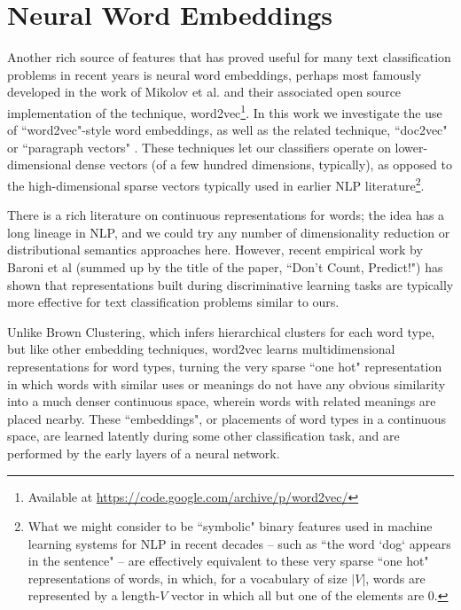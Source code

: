 \section{Neural Word Embeddings}
Another rich source of features that has proved useful for many text
classification problems in recent years is neural word embeddings, perhaps most
famously developed in the work of Mikolov et al. \cite{mikolovword2vec} and
their associated open source implementation of the technique,
word2vec\footnote{Available at
\url{https://code.google.com/archive/p/word2vec/}}. In this work we investigate
the use of ``word2vec"-style word embeddings, as well as the related technique,
``doc2vec" or ``paragraph vectors"
\cite{dai-document-embedding-2015,quocle-distributed-representations-2014}.
These techniques let our classifiers operate on lower-dimensional dense vectors
(of a few hundred dimensions, typically), as opposed to the high-dimensional
sparse vectors typically used in earlier NLP literature\footnote{
What we might consider to be ``symbolic" binary features used in machine
learning systems for NLP in recent decades -- such as ``the word `dog` appears
in the sentence" -- are effectively equivalent to these very sparse ``one hot"
representations of words, in which, for a vocabulary of size $|V|$, words are
represented by a length-$V$ vector in which all but one of the elements are
0.}.

There is a rich literature on continuous representations for words; the idea
has a long lineage in NLP, and we could try any number of dimensionality
reduction or distributional semantics approaches here. However, recent
empirical work by Baroni et al \cite{baroni2014don} (summed up by the title of
the paper, ``Don't Count, Predict!") has shown that representations built
during discriminative learning tasks are typically more effective for text
classification problems similar to ours.

Unlike Brown Clustering, which infers hierarchical clusters for each word type,
but like other embedding techniques, word2vec learns multidimensional
representations for word types, turning the very sparse ``one hot"
representation in which words with similar uses or meanings do not have any
obvious similarity into a much denser continuous space, wherein words with
related meanings are placed nearby. These ``embeddings", or placements of word
types in a continuous space, are learned latently during some other
classification task, and are performed by the early layers of a neural network.

